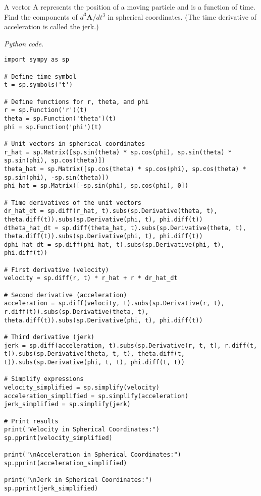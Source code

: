 \begin{problem}{6.10}
A vector A represents the position of a moving particle and is a function of time. Find the components of \(d^3 \mathbf{A} / d t^3\) in spherical coordinates. (The time derivative of acceleration is called the jerk.)
\end{problem}
\begin{solution}{6.10}
\textit{Python code.}
\begin{lstlisting}[language=iPython]
import sympy as sp

# Define time symbol
t = sp.symbols('t')

# Define functions for r, theta, and phi
r = sp.Function('r')(t)
theta = sp.Function('theta')(t)
phi = sp.Function('phi')(t)

# Unit vectors in spherical coordinates
r_hat = sp.Matrix([sp.sin(theta) * sp.cos(phi), sp.sin(theta) * sp.sin(phi), sp.cos(theta)])
theta_hat = sp.Matrix([sp.cos(theta) * sp.cos(phi), sp.cos(theta) * sp.sin(phi), -sp.sin(theta)])
phi_hat = sp.Matrix([-sp.sin(phi), sp.cos(phi), 0])

# Time derivatives of the unit vectors
dr_hat_dt = sp.diff(r_hat, t).subs(sp.Derivative(theta, t), theta.diff(t)).subs(sp.Derivative(phi, t), phi.diff(t))
dtheta_hat_dt = sp.diff(theta_hat, t).subs(sp.Derivative(theta, t), theta.diff(t)).subs(sp.Derivative(phi, t), phi.diff(t))
dphi_hat_dt = sp.diff(phi_hat, t).subs(sp.Derivative(phi, t), phi.diff(t))

# First derivative (velocity)
velocity = sp.diff(r, t) * r_hat + r * dr_hat_dt

# Second derivative (acceleration)
acceleration = sp.diff(velocity, t).subs(sp.Derivative(r, t), r.diff(t)).subs(sp.Derivative(theta, t), theta.diff(t)).subs(sp.Derivative(phi, t), phi.diff(t))

# Third derivative (jerk)
jerk = sp.diff(acceleration, t).subs(sp.Derivative(r, t, t), r.diff(t, t)).subs(sp.Derivative(theta, t, t), theta.diff(t, t)).subs(sp.Derivative(phi, t, t), phi.diff(t, t))

# Simplify expressions
velocity_simplified = sp.simplify(velocity)
acceleration_simplified = sp.simplify(acceleration)
jerk_simplified = sp.simplify(jerk)

# Print results
print("Velocity in Spherical Coordinates:")
sp.pprint(velocity_simplified)

print("\nAcceleration in Spherical Coordinates:")
sp.pprint(acceleration_simplified)

print("\nJerk in Spherical Coordinates:")
sp.pprint(jerk_simplified)
\end{lstlisting}
\end{solution}


